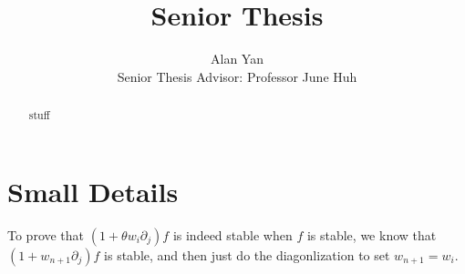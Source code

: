\documentclass[12pt]{article}
\title{Senior Thesis}
\author{Alan Yan \\ Senior Thesis Advisor: Professor June Huh}
\begin{document}
\maketitle

\begin{abstract}
	stuff 
\end{abstract}
\tableofcontents

\newpage 

\section{Small Details}

To prove that $(1 + \theta w_i \partial_j)f$ is indeed stable when $f$ is stable, we know that $(1 + w_{n+1} \partial_j)f$ is stable, and then just do the diagonlization to set $w_{n+1} = w_i$. 
\end{document}
